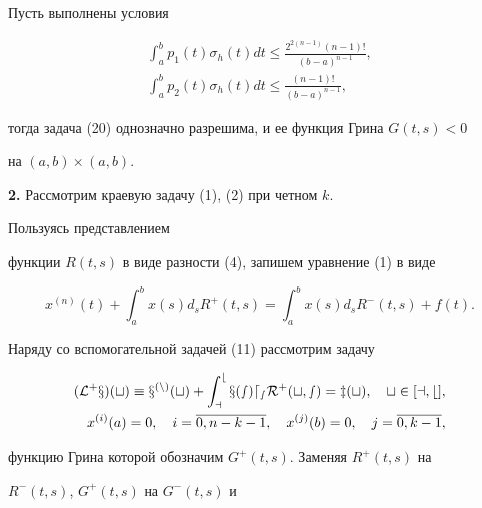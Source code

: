  


\begin{cor} Пусть выполнены условия 


\begin{gather*} 


\int^b_ap_1(t)\sigma_h(t)dt \le \frac{2^{2(n-1)}(n-1)!}{(b-a)^{n-1}},\\ 


% 


\int^b_ap_2(t)\sigma_h(t)dt \le \frac{(n-1)!}{(b-a)^{n-1}}, 


\end{gather*} 


тогда задача (20) однозначно разрешима, и ее функция Грина $G(t,s)<0$ 


на $(a,b)\times(a,b)$. 


\end{cor} 


 


{\bf 2.} Рассмотрим краевую задачу (1), (2) при четном $k$. 


Пользуясь представлением 


функции $R(t,s)$ в виде разности (4), запишем уравнение (1) в виде 


$$ 


x^{(n)}(t)+\int^b_ax(s)d_sR^+(t,s)= 


\int^b_ax(s)d_sR^-(t,s)+f(t). 


$$ 


Наряду со вспомогательной задачей (11) рассмотрим задачу 


\begin{equation} 


\begin{split} 


(\cal L^+x)(t)\equiv x^{(n)}(t)+\int^b_ax(s)d_sR^+(t,s)=z(t), 


\quad t\in[a,b],\\ 


x^{(i)}(a)=0,\quad i=\overline{0,n-k-1},\quad x^{(j)}(b)=0, 


\quad j=\overline{0,k-1}, 


\end{split} 


\end{equation} 


функцию Грина которой обозначим $G^+(t,s)$. Заменяя $R^+(t,s)$ на 


$R^-(t,s)$, $G^+(t,s)$ на $G^-(t,s)$ и 


